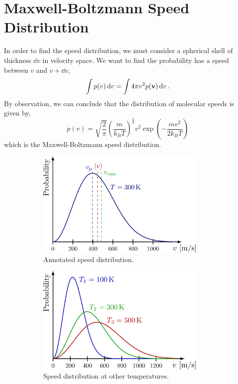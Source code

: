 \documentclass{book}
\begin{document}
\section{Maxwell-Boltzmann Speed Distribution}
In order to find the speed distribution, we must consider a spherical shell of thickness $\dd{v}$ in velocity space. We want to find the probability has a speed between $v$ and $v + \dd{v}$,
\begin{equation}
	\int p(v) \dd{v} = \int 4\pi v^2 p(\vb{v})\dd{v}.
\end{equation}
By observation, we can conclude that the distribution of molecular speeds is given by,
\begin{equation}
	\boxed{p(v) = \sqrt{\frac{2}{\pi}}\left(\frac{m}{k_BT}\right)^{\frac{3}{2}}v^2\exp\left(-\frac{mv^2}{2k_BT}\right)}
\end{equation}
which is the Maxwell-Boltzmann speed distribution.
\begin{figure}[t]
	\centering
	\begin{subfigure}{0.4\textwidth}
	\centering
	\includegraphics[width=0.9\textwidth]{maxwell-boltzmann-001.png}
	\caption{Annotated speed distribution.}
	\label{fig:maxwell boltzmann}
	\end{subfigure}
	\begin{subfigure}{0.4\textwidth}
		\centering
		\includegraphics[width=0.9\textwidth]{maxwell-boltzmann-002.png}
		\caption{Speed distribution at other temperatures.}
		\label{fig:maxwell boltzmann 2}
	\end{subfigure}
	\caption{}
\end{figure}
\end{document}
